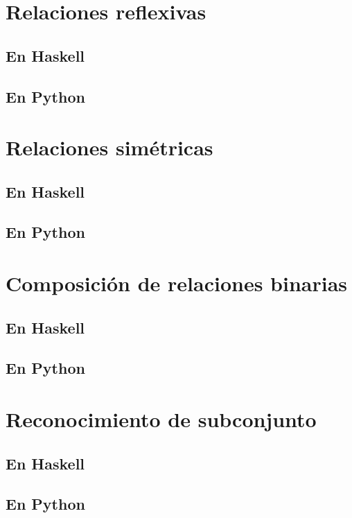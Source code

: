 \documentclass[a4paper,12pt,twoside]{book}
\begin{document}
\section{Relaciones reflexivas}
\subsection{En Haskell}
\subsection{En Python}

\section{Relaciones simétricas}
\subsection{En Haskell}
\subsection{En Python}

\section{Composición de relaciones binarias}
\subsection{En Haskell}
\subsection{En Python}

\section{Reconocimiento de subconjunto}
\subsection{En Haskell}
\subsection{En Python}
\end{document}
